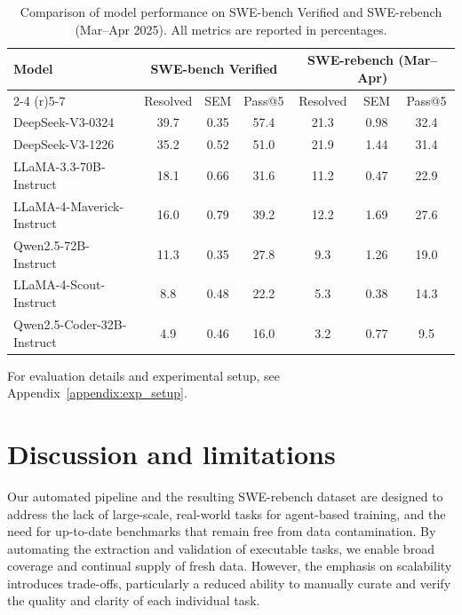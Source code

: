 \documentclass[dandb]{article}
\begin{document}
\begin{table}
  \caption{Comparison of model performance on SWE-bench Verified and SWE-rebench (Mar–Apr 2025). All metrics are reported in percentages.}
  \label{tab:swe-rebench-vs-verified}
  \centering
  \begin{tabular}{lcccccc}
    \toprule
    Model & 
    \multicolumn{3}{c}{SWE-bench Verified} & 
    \multicolumn{3}{c}{SWE-rebench (Mar–Apr)} \\
    \cmidrule(r){2-4} \cmidrule(r){5-7}
    & Resolved & SEM & Pass@5 & Resolved & SEM & Pass@5 \\
    \midrule
    DeepSeek-V3-0324 & 39.7 & 0.35 & 57.4 & 21.3 & 0.98 & 32.4 \\
    DeepSeek-V3-1226      & 35.2 & 0.52 & 51.0 & 21.9 & 1.44 & 31.4 \\
    LLaMA-3.3-70B-Instruct & 18.1 & 0.66 & 31.6 & 11.2 & 0.47 & 22.9 \\
    LLaMA-4-Maverick-Instruct & 16.0 & 0.79 & 39.2 & 12.2 & 1.69 & 27.6 \\
    Qwen2.5-72B-Instruct   & 11.3 & 0.35 & 27.8 & 9.3 & 1.26 & 19.0 \\
    LLaMA-4-Scout-Instruct & 8.8 & 0.48 & 22.2 & 5.3 & 0.38 & 14.3 \\
    Qwen2.5-Coder-32B-Instruct & 4.9 & 0.46 & 16.0 & 3.2 & 0.77 & 9.5 \\
    \bottomrule
  \end{tabular}
\end{table}

For evaluation details and experimental setup, see Appendix~\ref{appendix:exp_setup}.

\section{Discussion and limitations}
\label{sec:discussion_and_limitations}

Our automated pipeline and the resulting SWE-rebench dataset are designed to address the lack of large-scale, real-world tasks for agent-based training, and the need for up-to-date benchmarks that remain free from data contamination. By automating the extraction and validation of executable tasks, we enable broad coverage and continual supply of fresh data. However, the emphasis on scalability introduces trade-offs, particularly a reduced ability to manually curate and verify the quality and clarity of each individual task.
\end{document}
